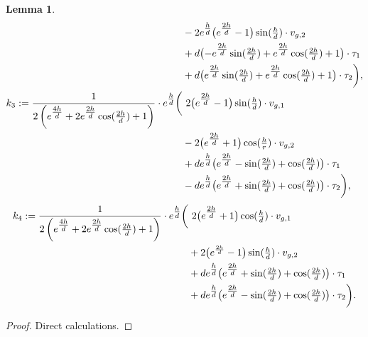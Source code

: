 \documentclass[preprint]{elsarticle}
\newtheorem{lem}[lem]{Lemma}
\numberwithin{equation}{section}
\begin{document}
\begin{lem}
\begin{equation}
\begin{aligned}
			& &&-2 e^{\tfrac{h}{d}} \bigl(e^{\tfrac{2 h}{d}}-1\bigr) \sin (\tfrac{h}{d}) \cdot v_{g,2}
			\\
			& &&+d \bigl(-e^{\tfrac{2 h}{d}} \sin (\tfrac{2 h}{d})+e^{\tfrac{2 h}{d}} \cos (\tfrac{2 h}{d})+1\bigr) \cdot \tau_1 \\
			& &&+d \bigl(e^{\tfrac{2 h}{d}} \sin (\tfrac{2 h}{d})+e^{\tfrac{2 h}{d}} \cos (\tfrac{2 h}{d})+1\bigr) \cdot \tau_2 \biggr), \\
				k_3 &:=	
			\frac{1}{2 \left(e^{\tfrac{4 h}{d}}+2 e^{\tfrac{2 h}{d}} \cos (\tfrac{2 h}{d})+1\right)}
			\cdot e^{\tfrac{h}{d}}
			\biggl( \hspace{-1 em}
			&&\ 2 \bigl(e^{\tfrac{2 h}{d}}-1\bigr) \sin (\tfrac{h}{d}) \cdot v_{g,1} \\
			& &&-2 \bigl(e^{\tfrac{2 h}{d}}+1\bigr) \cos (\tfrac{h}{r}) \cdot v_{g,2}
			\\
			& &&+d e^{\tfrac{h}{d}} \bigl(e^{\tfrac{2 h}{d}}-\sin (\tfrac{2 h}{d})+\cos (\tfrac{2 h}{d})\bigr) \cdot \tau_1 \\
			& &&-d e^{\tfrac{h}{d}} \bigl(e^{\tfrac{2 h}{d}}+\sin (\tfrac{2 h}{d})+\cos (\tfrac{2 h}{d})
			\bigr) \cdot \tau_2 \biggr), 
		\end{aligned}			\label{eq:coefficients_2}
		\end{equation}
		\begin{equation*}
			\begin{aligned}
			k_4 &:=	
			\frac{1}{2 \left(e^{\tfrac{4 h}{d}}+2 e^{\tfrac{2 h}{d}} \cos (\tfrac{2 h}{d})+1\right)}
			\cdot e^{\tfrac{h}{d}}
			\biggl( \hspace{-1 em}
			&&\ 2 \bigl(e^{\tfrac{2 h}{d}}+1\bigr) \cos (\tfrac{h}{d}) \cdot v_{g,1} \\
			& &&+ 2 \bigl(e^{\frac{2 h}{d}}-1\bigr) \sin (\tfrac{h}{d}) \cdot v_{g,2}
			\\
			& &&+d e^{\tfrac{h}{d}} \bigl(e^{\tfrac{2 h}{d}}+\sin (\tfrac{2 h}{d})+\cos (\tfrac{2 h}{d})\bigr) \cdot \tau_1 \\
			&
			&&+d e^{\tfrac{h}{d}} \bigl(e^{\tfrac{2 h}{d}}-\sin (\tfrac{2 h}{d})+\cos (\tfrac{2 h}{d})
			\bigr) \cdot \tau_2 \biggr).  
		\end{aligned}
	\end{equation*}
\end{lem}
\begin{proof}
	Direct calculations.
\end{proof}
\end{document}
